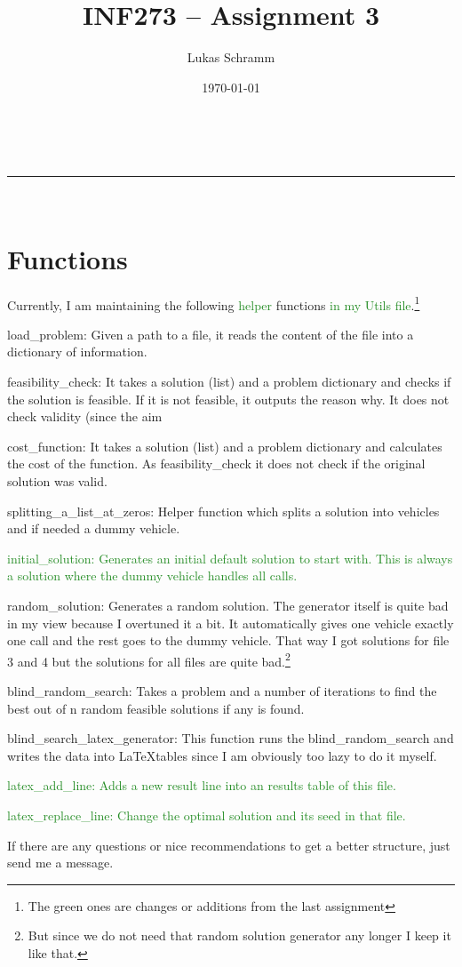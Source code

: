 \documentclass[a4paper,11pt]{article}
\makeatletter
\newcommand{\linia}{\rule{\linewidth}{0.5pt}}
\theoremstyle{mytheor}
\renewcommand{\maketitle}{
\begin{center}
\vspace{2ex}
{\huge \textsc{\@title}}
\vspace{1ex}
\\
\linia\\
\@author \hfill \@date
\vspace{4ex}
\end{center}
}
\makeatother
\begin{document}
\title{INF273 – Assignment 3}

\author{Lukas Schramm}

\date{\today}

\maketitle

\section{Functions}
Currently, I am maintaining the following \textcolor{ForestGreen}{helper} functions \textcolor{ForestGreen}{in my Utils file}.\footnote{The green ones are changes or additions from the last assignment}
\begin{itemize}
\item load\_problem: Given a path to a file, it reads the content of the file into a dictionary of information.
\item feasibility\_check: It takes a solution (list) and a problem dictionary and checks if the solution is feasible. If it is not feasible, it outputs the reason why. It does not check validity (since the aim
\item cost\_function: It takes a solution (list) and a problem dictionary and calculates the cost of the function. As feasibility\_check it does not check if the original solution was valid.
\item splitting\_a\_list\_at\_zeros: Helper function which splits a solution into vehicles and if needed a dummy vehicle.
\textcolor{ForestGreen}{\item initial\_solution: Generates an initial default solution to start with. This is always a solution where the dummy vehicle handles all calls.}
\item random\_solution: Generates a random solution. The generator itself is quite bad in my view because I overtuned it a bit. It automatically gives one vehicle exactly one call and the rest goes to the dummy vehicle. That way I got solutions for file 3 and 4 but the solutions for all files are quite bad.\footnote{But since we do not need that random solution generator any longer I keep it like that.}
\item blind\_random\_search: Takes a problem and a number of iterations to find the best out of n random feasible solutions if any is found.
\item blind\_search\_latex\_generator: This function runs the blind\_random\_search and writes the data into \LaTeX tables since I am obviously too lazy to do it myself.
\item \textcolor{ForestGreen}{latex\_add\_line: Adds a new result line into an results table of this file.}
\item \textcolor{ForestGreen}{latex\_replace\_line: Change the optimal solution and its seed in that file.}

If there are any questions or nice recommendations to get a better structure, just send me a message.
\end{itemize}
\end{document}
